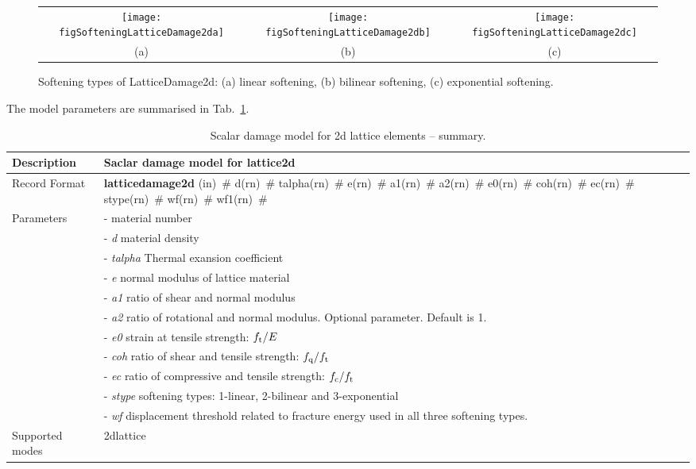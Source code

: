 \documentclass[a4paper]{article}
\newcommand{\descitem}[1]{{\noindent \bf #1}}
\newcommand{\elemparam}[2]{{{#1\tiny (#2)}~\#}}
\newcommand{\param}[1]{{\it #1}}
\newenvironment{mmt}{\begin{tabular}{|l|p{9cm}|}}{\end{tabular}\\}
\newenvironment{mmt}{\begin{tabular}{|l|l|}}{\end{tabular}\\}
\begin{document}
\begin{figure}[!htb]
\begin{tabular}{ccc}
\texttt{[image: figSofteningLatticeDamage2da]} & \texttt{[image: figSofteningLatticeDamage2db]} & \texttt{[image: figSofteningLatticeDamage2dc]}\\
(a) & (b) & (c)
\end{tabular}
  \caption{Softening types of LatticeDamage2d: (a) linear softening, (b) bilinear softening, (c) exponential softening.}
  \label{SofteningLatticeDamage2d}
\end{figure}

The model parameters are summarised in Tab.~\ref{latticedamage2d_table}.
\begin{table}[!htb]
\begin{mmt}
\hline
Description & Saclar damage model for lattice2d \\
\hline
Record Format & \descitem{latticedamage2d} \elemparam{}{in} 
\elemparam{d}{rn} \elemparam{talpha}{rn} \elemparam{e}{rn} \elemparam{a1}{rn} \elemparam{a2}{rn} \elemparam{e0}{rn}  \elemparam{coh}{rn} \elemparam{ec}{rn} \elemparam{stype}{rn} \elemparam{wf}{rn} \elemparam{wf1}{rn} \\
Parameters &- \param{} material number\\
&- \param{d} material density\\
&- \param{talpha} Thermal exansion coefficient\\
&- \param{e} normal modulus of lattice material\\
&- \param{a1} ratio of shear and normal modulus\\
&- \param{a2} ratio of rotational and normal modulus. Optional parameter. Default is 1.\\
&- \param{e0} strain at tensile strength: $f_{\rm t}/E$\\
&- \param{coh} ratio of shear and tensile strength: $f_{\rm q}/f_{\rm t}$\\
&- \param{ec} ratio of compressive and tensile strength: $f_{\rm c}/f_{\rm t}$\\
&- \param{stype} softening types: 1-linear, 2-bilinear and 3-exponential\\
&- \param{wf} displacement threshold related to fracture energy used in all three softening types.\\

Supported modes& 2dlattice\\
\hline
\end{mmt}
\caption{Scalar damage model for 2d lattice elements -- summary.}
\label{latticedamage2d_table}
\end{table}
\end{document}

